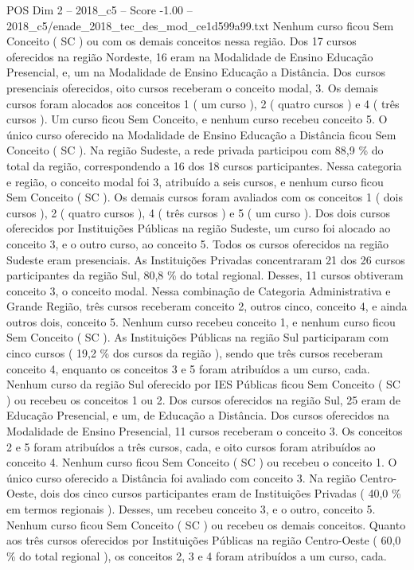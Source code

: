 \begin{textsample}{POS Dim 2 – 2018\_c5 – Score -1.00 – 2018\_c5/enade\_2018\_tec\_des\_mod\_ce1d599a99.txt}
Nenhum curso ficou Sem Conceito ( SC ) ou com os demais conceitos nessa região.
Dos 17 cursos oferecidos na região Nordeste, 16 eram na Modalidade de Ensino Educação Presencial, e, um na Modalidade de Ensino Educação a Distância.
Dos cursos presenciais oferecidos, oito cursos receberam o conceito modal, 3.
Os demais cursos foram alocados aos conceitos 1 ( um curso ), 2 ( quatro cursos ) e 4 ( três cursos ).
Um curso ficou Sem Conceito, e nenhum curso recebeu conceito 5.
O único curso oferecido na Modalidade de Ensino Educação a Distância ficou Sem Conceito ( SC ).
Na região Sudeste, a rede privada participou com 88,9 \% do total da região, correspondendo a 16 dos 18 cursos participantes.
Nessa categoria e região, o conceito modal foi 3, atribuído a seis cursos, e nenhum curso ficou Sem Conceito ( SC ).
Os demais cursos foram avaliados com os conceitos 1 ( dois cursos ), 2 ( quatro cursos ), 4 ( três cursos ) e 5 ( um curso ).
Dos dois cursos oferecidos por Instituições Públicas na região Sudeste, um curso foi alocado ao conceito 3, e o outro curso, ao conceito 5.
Todos os cursos oferecidos na região Sudeste eram presenciais.
As Instituições Privadas concentraram 21 dos 26 cursos participantes da região Sul, 80,8 \% do total regional.
Desses, 11 cursos obtiveram conceito 3, o conceito modal.
Nessa combinação de Categoria Administrativa e Grande Região, três cursos receberam conceito 2, outros cinco, conceito 4, e ainda outros dois, conceito 5.
Nenhum curso recebeu conceito 1, e nenhum curso ficou Sem Conceito ( SC ).
As Instituições Públicas na região Sul participaram com cinco cursos ( 19,2 \% dos cursos da região ), sendo que três cursos receberam conceito 4, enquanto os conceitos 3 e 5 foram atribuídos a um curso, cada.
Nenhum curso da região Sul oferecido por IES Públicas ficou Sem Conceito ( SC ) ou recebeu os conceitos 1 ou 2.
Dos cursos oferecidos na região Sul, 25 eram de Educação Presencial, e um, de Educação a Distância.
Dos cursos oferecidos na Modalidade de Ensino Presencial, 11 cursos receberam o conceito 3.
Os conceitos 2 e 5 foram atribuídos a três cursos, cada, e oito cursos foram atribuídos ao conceito 4.
Nenhum curso ficou Sem Conceito ( SC ) ou recebeu o conceito 1.
O único curso oferecido a Distância foi avaliado com conceito 3.
Na região Centro-Oeste, dois dos cinco cursos participantes eram de Instituições Privadas ( 40,0 \% em termos regionais ).
Desses, um recebeu conceito 3, e o outro, conceito 5.
Nenhum curso ficou Sem Conceito ( SC ) ou recebeu os demais conceitos.
Quanto aos três cursos oferecidos por Instituições Públicas na região Centro-Oeste ( 60,0 \% do total regional ), os conceitos 2, 3 e 4 foram atribuídos a um curso, cada.

\end{textsample}
